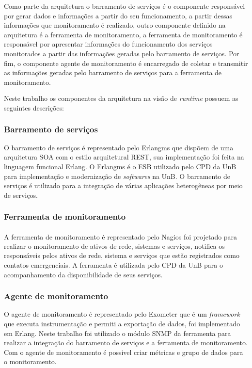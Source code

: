 Como parte da arquitetura o barramento de serviços é o componente responsável por gerar dados e informações a partir do seu funcionamento, a partir dessas informações que monitoramento é realizado, outro componente definido na arquitetura é a ferramenta de monitoramento, a ferramenta de monitoramento é responsável por apresentar informações do funcionamento dos serviços monitorados a partir das informações geradas pelo barramento de serviços. Por fim, o componente agente de monitoramento é encarregado de coletar e transmitir as informações geradas pelo barramento de serviços para a ferramenta de monitoramento.  

Neste trabalho os componentes da arquitetura na visão de \textit{runtime}\cite{clements2002documenting} possuem as seguintes descrições:

\subsubsection{Barramento de serviços}
O barramento de serviços é representado pelo Erlangms que dispõem de uma arquitetura SOA com o estilo arquitetural REST, sua implementação foi feita na linguagem funcional Erlang. O Erlangms é o \acrshort{ESB} utilizado pelo \acrshort{CPD} da \acrshort{UnB} para implementação e modernização de \textit{softwares} na \acrshort{UnB}. O barramento de serviços é utilizado para a integração de várias aplicações heterogêneas por meio de serviços.

\subsubsection{Ferramenta de monitoramento}
A ferramenta de monitoramento é representado pelo Nagios\textsuperscript{\textregistered} foi projetado para realizar o monitoramento de ativos de rede, sistemas e serviços, notifica os responsáveis pelos ativos de rede, sistema e serviços que estão registrados como contatos emergenciais. A ferramenta é utilizada pelo \acrshort{CPD} da \acrshort{UnB} para o acompanhamento da  disponibilidade de seus serviços.

\subsubsection{Agente de monitoramento}
O agente de monitoramento é representado pelo Exometer que é um \textit{framework} que executa instrumentação e permiti a exportação de dados, foi implementado em Erlang. Neste trabalho foi utilizado o módulo SNMP da ferramenta para realizar a integração do barramento de serviços e a ferramenta de monitoramento. Com o agente de monitoramento é possivel criar métricas e grupo de dados para o monitoramento.

